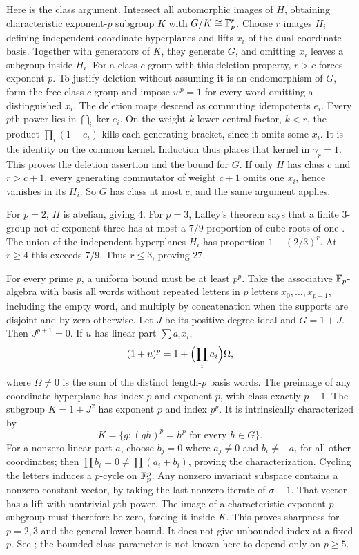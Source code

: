 Here is the class argument. Intersect all automorphic images
of \(H\), obtaining characteristic exponent-\(p\) subgroup
\(K\) with \(G/K\cong\mathbb F_p^r\).
Choose \(r\) images \(H_i\) defining independent coordinate
hyperplanes and lifts \(x_i\) of the dual coordinate basis.
Together with generators of \(K\), they generate \(G\), and
omitting \(x_i\) leaves a subgroup inside \(H_i\).
For a class-\(c\) group with this deletion property, \(r>c\)
forces exponent \(p\).
To justify deletion without assuming it is an endomorphism
of \(G\), form the free class-\(c\) group and impose \(w^p=1\)
for every word omitting a distinguished \(x_i\).
The deletion maps descend as commuting idempotents \(e_i\).
Every \(p\)th power lies in \(\bigcap_i\ker e_i\).
On the weight-\(k\) lower-central factor, \(k<r\), the product
\(\prod_i(1-e_i)\) kills each generating bracket, since it
omits some \(x_i\). It is the identity on the common kernel.
Induction thus places that kernel in \(\gamma_r=1\).
This proves the deletion assertion and the bound for \(G\).
If only \(H\) has class \(c\) and \(r>c+1\), every generating
commutator of weight \(c+1\) omits one \(x_i\), hence vanishes
in its \(H_i\). So \(G\) has class at most \(c\), and the same
argument applies.

For \(p=2\), \(H\) is abelian, giving \(4\).
For \(p=3\), Laffey's theorem says that a finite 3-group not
of exponent three has at most a \(7/9\) proportion of cube roots
of one \cite{laffey}.
The union of the independent hyperplanes \(H_i\) has proportion
\(1-(2/3)^r\). At \(r\ge4\) this exceeds \(7/9\).
Thus \(r\le3\), proving \(27\).

For every prime \(p\), a uniform bound must be at least \(p^p\).
Take the associative \(\mathbb F_p\)-algebra with basis all words
without repeated letters in \(p\) letters \(x_0,\ldots,x_{p-1}\),
including the empty word, and multiply by concatenation when
the supports are disjoint and by zero otherwise.
Let \(J\) be its positive-degree ideal and \(G=1+J\).
Then \(J^{p+1}=0\). If \(u\) has linear part \(\sum a_ix_i\),
\[
 (1+u)^p=1+\Bigl(\prod_i a_i\Bigr)\Omega,
\]
where \(\Omega\ne0\) is the sum of the distinct length-\(p\)
basis words. The preimage of any coordinate hyperplane
has index \(p\) and exponent \(p\), with class exactly \(p-1\).
The subgroup \(K=1+J^2\) has exponent \(p\) and index \(p^p\).
It is intrinsically characterized by
\[
 K=\{g:(gh)^p=h^p\text{ for every }h\in G\}.
\]
For a nonzero linear part \(a\), choose \(b_j=0\) where
\(a_j\ne0\) and \(b_i\ne-a_i\) for all other coordinates;
then \(\prod b_i=0\ne\prod(a_i+b_i)\), proving the characterization.
Cycling the letters induces a \(p\)-cycle on \(\mathbb F_p^p\).
Any nonzero invariant subspace contains a nonzero constant
vector, by taking the last nonzero iterate of \(\sigma-1\).
That vector has a lift with nontrivial \(p\)th power.
The image of a characteristic exponent-\(p\) subgroup must
therefore be zero, forcing it inside \(K\).
This proves sharpness for \(p=2,3\) and the general lower bound.
It does not give unbounded index at a fixed \(p\).
See ; the bounded-class
parameter is not known here to depend only on \(p\ge5\).

